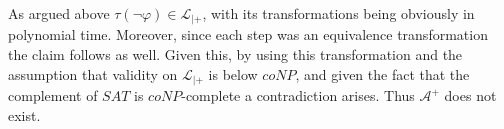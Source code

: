 \documentclass[11pt,a4paper]{article}
\begin{document}
As argued above $\tau(\neg \varphi) \in \mathcal{L}_{|+}$, with its transformations being obviously in polynomial time. Moreover, since each step was an equivalence transformation the claim follows as well. 
Given this, by using this transformation and the assumption that validity on $\mathcal{L}_{|+}$ is below $coNP$, and given the fact that the complement of $SAT$ is $coNP$-complete a contradiction arises. Thus $\mathcal{A}^+$ does not exist.

%
%
%
%
%
%
%
%
%
%
%
%
%
%
\end{document}
